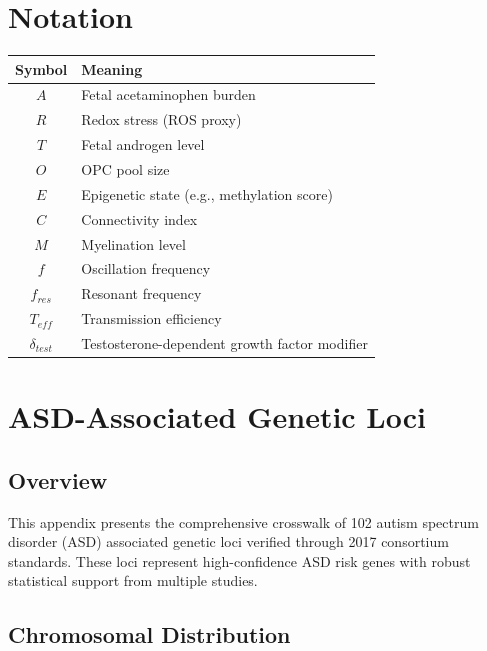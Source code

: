 \documentclass[11pt]{article}
\let\oldsection\section
\renewcommand{\section}[1]{\oldsection{#1}\setlength{\leftskip}{0em}}
\let\oldsubsection\subsection
\renewcommand{\subsection}[1]{\oldsubsection{#1}\setlength{\leftskip}{0.75em}}
\begin{document}
\clearpage
\section{Notation}

\begin{table}[h]
\centering
\begin{tabular}{cl}
\toprule
\textbf{Symbol} & \textbf{Meaning} \\
\midrule
$A$ & Fetal acetaminophen burden \\
$R$ & Redox stress (ROS proxy) \\
$T$ & Fetal androgen level \\
$O$ & OPC pool size \\
$E$ & Epigenetic state (e.g., methylation score) \\
$C$ & Connectivity index \\
$M$ & Myelination level \\
$f$ & Oscillation frequency \\
$f_{res}$ & Resonant frequency \\
$T_{eff}$ & Transmission efficiency \\
$\delta_{test}$ & Testosterone-dependent growth factor modifier \\
\bottomrule
\end{tabular}
\end{table}

\clearpage
\section{ASD-Associated Genetic Loci}

\subsection{Overview}
This appendix presents the comprehensive crosswalk of 102 autism spectrum disorder (ASD) associated genetic loci verified through 2017 consortium standards. These loci represent high-confidence ASD risk genes with robust statistical support from multiple studies.

\subsection{Chromosomal Distribution}
\end{document}
